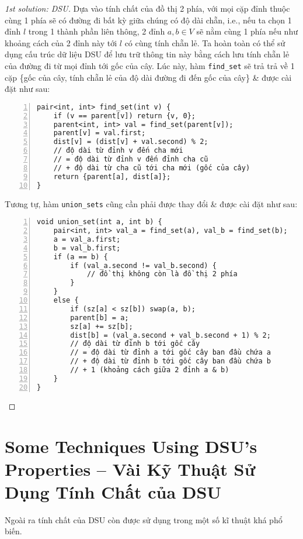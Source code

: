 \documentclass{article}
\begin{document}
\begin{proof}[1st solution: DSU]
    Dựa vào tính chất của đồ thị 2 phía, với mọi cặp đỉnh thuộc cùng 1 phía sẽ có đường đi bất kỳ giữa chúng có độ dài chẵn, i.e., nếu ta chọn 1 đỉnh $l$ trong 1 thành phần liên thông, 2 đỉnh $a,b\in V$ sẽ nằm cùng 1 phía nếu như khoảng cách của 2 đỉnh này tới $l$ có cùng tính chẵn lẻ. Ta hoàn toàn có thể sử dụng cấu trúc dữ liệu DSU để lưu trữ thông tin này bằng cách lưu tính chẵn lẻ của đường đi từ mọi đỉnh tới gốc của cây. Lúc này, hàm \verb|find_set| sẽ trả trả về 1 cặp \{gốc của cây, tính chẵn lẻ của độ dài đường đi đến gốc của cây\} \& được cài đặt như sau:
    \begin{Verbatim}[numbers=left,xleftmargin=5mm]
pair<int, int> find_set(int v) {
    if (v == parent[v]) return {v, 0};
    parent<int, int> val = find_set(parent[v]);
    parent[v] = val.first;
    dist[v] = (dist[v] + val.second) % 2;
    // độ dài từ đỉnh v đến cha mới
    // = độ dài từ đỉnh v đến đỉnh cha cũ
    // + độ dài từ cha cũ tới cha mới (gốc của cây)
    return {parent[a], dist[a]};
}
    \end{Verbatim}
    Tương tự, hàm \verb|union_sets| cũng cần phải được thay đổi \& được cài đặt như sau:
    \begin{Verbatim}[numbers=left,xleftmargin=5mm]
void union_set(int a, int b) {
    pair<int, int> val_a = find_set(a), val_b = find_set(b);
    a = val_a.first;
    b = val_b.first;
    if (a == b) {
        if (val_a.second != val_b.second) {
            // đồ thị không còn là đồ thị 2 phía
        }
    }
    else {
        if (sz[a] < sz[b]) swap(a, b);
        parent[b] = a;
        sz[a] += sz[b];
        dist[b] = (val_a.second + val_b.second + 1) % 2;
        // độ dài từ đỉnh b tới gốc cây
        // = độ dài từ đỉnh a tới gốc cây ban đầu chứa a
        // + độ dài từ đỉnh b tới gốc cây ban đầu chứa b
        // + 1 (khoảng cách giữa 2 đỉnh a & b)
    }
}
    \end{Verbatim}
\end{proof}


\section{Some Techniques Using DSU's Properties -- Vài Kỹ Thuật Sử Dụng Tính Chất của DSU}
Ngoài ra tính chất của DSU còn được sử dụng trong một số kĩ thuật khá phổ biến.

\end{document}
